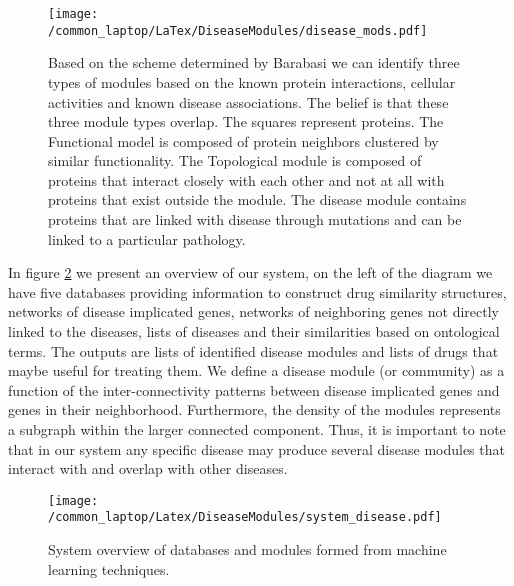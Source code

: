 \documentclass[a4paper,8pt,twocolumn,5p]{elsarticle}
\begin{document}
\begin{figure}[h]
  \begin{center}
\texttt{[image: /common\_laptop/LaTex/DiseaseModules/disease\_mods.pdf]} %
  \end{center}
 \caption{Based on the scheme determined by Barabasi we can identify three types of modules based on the known protein interactions, cellular activities and known disease associations. The belief is that these three module types overlap.  The squares represent proteins. The Functional model is composed of protein neighbors clustered by similar functionality. The Topological module is composed of proteins that interact closely  with each other and not at all with proteins that exist outside the module. The disease module contains proteins that are linked with disease through mutations and can be linked to a particular pathology.}
\label{dismod1}
\end{figure}


In figure \ref{system} we present an overview of our system, on the left of the diagram we have five databases providing information to construct drug similarity structures, networks of disease implicated genes, networks of neighboring genes not directly linked to the diseases, lists of diseases and their similarities based on ontological terms.   The outputs are lists of identified disease modules and lists of drugs that maybe useful for treating them. We define a disease module (or community) as a function of the inter-connectivity patterns between disease implicated genes and genes in their neighborhood. Furthermore, the density of the modules represents a subgraph within the larger connected component. Thus, it is important to note that in our system any specific disease may produce several disease modules that interact with and overlap with other diseases. 


\begin{figure}[h]
  \begin{center}
 \texttt{[image: /common\_laptop/Latex/DiseaseModules/system\_disease.pdf]} 
  \end{center}
 \caption{System overview of databases and modules formed from machine learning techniques.}
\label{system}
\end{figure}
\end{document}
